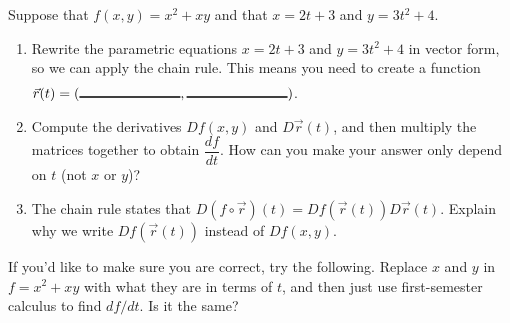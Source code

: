 \begin{problem}%
 Suppose that $f(x,y) = x^2+xy$ and that $x=2t+3$ and $y=3t^2+4$.
 \begin{enumerate}
  \item Rewrite the parametric equations $x=2t+3$ and $y=3t^2+4$ in vector form, so we can apply the chain rule. This means you need to create a function $\vec r(t) = (\blank{1in}, \blank{1in})$.
  \item Compute the derivatives $Df(x,y)$ and $D\vec r(t)$, and then multiply the matrices together to obtain $\dfrac{df}{dt}$. How can you make your answer only depend on $t$ (not $x$ or $y$)?
  \item The chain rule states that $D(f\circ \vec r)(t) = Df(\vec r(t))D\vec r(t)$. Explain why we write $Df(\vec r(t))$ instead of $Df(x,y)$.
 \end{enumerate}
If you'd like to make sure you are correct, try the following. Replace $x$ and $y$ in $f=x^2+xy$ with what they are in terms of $t$, and then just use first-semester calculus to find $df/dt$. Is it the same?
\end{problem}


